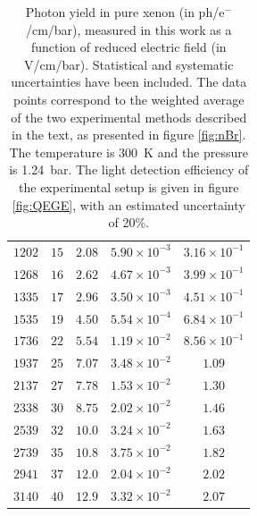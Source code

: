 \documentclass[%
 reprint,
superscriptaddress,
 amsmath,amssymb,
 aps,
]{revtex4-2}
\begin{document}
\begin{table}[t!]
\begin{tabular}{c c c c c}
$1202$ &	$15$ &	$2.08$ &	$5.90 \times 10^{-3}$ & 	$3.16 \times 10^{-1}$ 	\\
$1268$ &	$16$ &	$2.62$ &	$4.67 \times 10^{-3}$ & 	$3.99 \times 10^{-1}$ 	\\
$1335$ &	$17$ &	$2.96$ &	$3.50 \times 10^{-3}$ & 	$4.51 \times 10^{-1}$ 	\\
$1535$ &	$19$ &	$4.50$ &	$5.54 \times 10^{-4}$ & 	$6.84 \times 10^{-1}$ 	\\
$1736$ &	$22$ &	$5.54$ &	$1.19 \times 10^{-2}$ & 	$8.56 \times 10^{-1}$ 	\\
$1937$ &	$25$ &	$7.07$ &	$3.48 \times 10^{-2}$ & 	$1.09$ 	\\
$2137$ &	$27$ &	$7.78$ &	$1.53 \times 10^{-2}$ & 	$1.30$ 	\\
$2338$ &	$30$ &	$8.75$ &	$2.02 \times 10^{-2}$ & 	$1.46$ 	\\
$2539$ &	$32$ &	$10.0$ &	$3.24 \times 10^{-2}$ & 	$1.63$ 	\\
$2739$ &	$35$ &	$10.8$ &	$3.75 \times 10^{-2}$ & 	$1.82$ 	\\
$2941$ &	$37$ &	$12.0$ &	$2.04 \times 10^{-2}$ & 	$2.02$ 	\\
$3140$ &	$40$ &	$12.9$ &	$3.32 \times 10^{-2}$ & 	$2.07$ 	\\
\hline
\end{tabular}
\caption{\label{tab:data} Photon yield in pure xenon (in ph/e$^{-}$/cm/bar), measured in this work as a function of reduced electric field (in V/cm/bar). Statistical and systematic uncertainties have been included. The data points correspond to the weighted average of the two experimental methods described in the text, as presented in figure \ref{fig:nBr}. The temperature is 300~K and the pressure is 1.24~bar. The light detection efficiency of the experimental setup is given in figure \ref{fig:QEGE}, with an estimated uncertainty of 20\%.}
\end{table}



\end{document}

